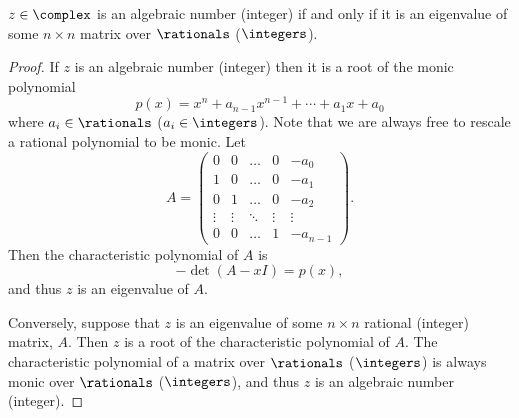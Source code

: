 \documentclass[fleqn]{NotesClass}
\begin{document}
    \begin{lma}{}{}
        \(z \in \complex\) is an algebraic number (integer) if and only if it is an eigenvalue of some \(n \times n\) matrix over \(\rationals\) (\(\integers\)).
        \begin{proof}
            If \(z\) is an algebraic number (integer) then it is a root of the monic polynomial
            \begin{equation}
                p(x) = x^n + a_{n-1}x^{n-1} + \dotsb + a_1x + a_0
            \end{equation}
            where \(a_i \in \rationals\) (\(a_i \in \integers\)).
            Note that we are always free to rescale a rational polynomial to be monic.
            Let
            \begin{equation}
                A = 
                \begin{pmatrix}
                    0 & 0 & \dots & 0 & -a_0\\
                    1 & 0 & \dots & 0 & -a_1\\
                    0 & 1 & \dots & 0 &  -a_2\\
                    \vdots & \vdots & \ddots & \vdots & \vdots\\
                    0 & 0 & \dots & 1 & -a_{n-1}
                \end{pmatrix}
                .
            \end{equation}
            Then the characteristic polynomial of \(A\) is
            \begin{equation}
                -\det(A - x I) = p(x),
            \end{equation}
            and thus \(z\) is an eigenvalue of \(A\).
            
            Conversely, suppose that \(z\) is an eigenvalue of some \(n \times n\) rational (integer) matrix, \(A\).
            Then \(z\) is a root of the characteristic polynomial of \(A\).
            The characteristic polynomial of a matrix over \(\rationals\) (\(\integers\)) is always monic over \(\rationals\) (\(\integers\)), and thus \(z\) is an algebraic number (integer).
        \end{proof}
    \end{lma}
    
\end{document}

